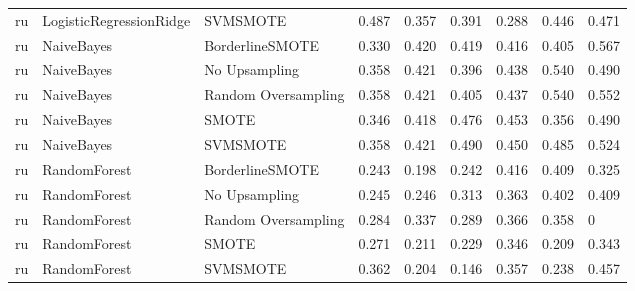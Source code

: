 \begin{tabular}{lllllllll}
      ru &      LogisticRegressionRidge &            SVMSMOTE & 0.487 &                     0.357 &                 0.391 &                  0.288 &                                   0.446 &     0.471 \\
      ru &                   NaiveBayes &     BorderlineSMOTE & 0.330 &                     0.420 &                 0.419 &                  0.416 &                                   0.405 &     0.567 \\
      ru &                   NaiveBayes &       No Upsampling & 0.358 &                     0.421 &                 0.396 &                  0.438 &                                   0.540 &     0.490 \\
      ru &                   NaiveBayes & Random Oversampling & 0.358 &                     0.421 &                 0.405 &                  0.437 &                                   0.540 &     0.552 \\
      ru &                   NaiveBayes &               SMOTE & 0.346 &                     0.418 &                 0.476 &                  0.453 &                                   0.356 &     0.490 \\
      ru &                   NaiveBayes &            SVMSMOTE & 0.358 &                     0.421 &                 0.490 &                  0.450 &                                   0.485 &     0.524 \\
      ru &                 RandomForest &     BorderlineSMOTE & 0.243 &                     0.198 &                 0.242 &                  0.416 &                                   0.409 &     0.325 \\
      ru &                 RandomForest &       No Upsampling & 0.245 &                     0.246 &                 0.313 &                  0.363 &                                   0.402 &     0.409 \\
      ru &                 RandomForest & Random Oversampling & 0.284 &                     0.337 &                 0.289 &                  0.366 &                                   0.358 &         0 \\
      ru &                 RandomForest &               SMOTE & 0.271 &                     0.211 &                 0.229 &                  0.346 &                                   0.209 &     0.343 \\
      ru &                 RandomForest &            SVMSMOTE & 0.362 &                     0.204 &                 0.146 &                  0.357 &                                   0.238 &     0.457 \\

\end{tabular}
